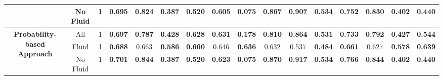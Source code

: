 \begin{table}[!ht]
{\begin{tabular}{|c|c|c|ccc|ccc|ccc|c|c|c|c|}
			& No Fluid & 1 & \multicolumn{1}{c|}{0.695} & \multicolumn{1}{c|}{0.824} & \textbf{0.387} & \multicolumn{1}{c|}{\textbf{0.520}} & \multicolumn{1}{c|}{0.605} & \textbf{0.075} & \multicolumn{1}{c|}{0.867} & \multicolumn{1}{c|}{0.907} & \textbf{0.534} & 0.752 & 0.830 & \textbf{0.402} & \textbf{0.440} \\
			
			\hline
			\hline
			
			\multirow{3}{*}{\parbox{2cm}{\textbf{Probability-based Approach}}} & All & 1 & \multicolumn{1}{c|}{\textbf{0.697}} & \multicolumn{1}{c|}{\textbf{0.787}} & \textbf{0.428} & \multicolumn{1}{c|}{\textbf{0.628}} & \multicolumn{1}{c|}{\textbf{0.631}} & \textbf{0.178} & \multicolumn{1}{c|}{\textbf{0.810}} & \multicolumn{1}{c|}{\textbf{0.864}} & \textbf{0.531} & \textbf{0.733} & \textbf{0.792} & \textbf{0.427} & \textbf{0.544} \\
			
			& Fluid & 1 & \multicolumn{1}{c|}{\textbf{0.688}} & \multicolumn{1}{c|}{0.663} & \textbf{0.586} & \multicolumn{1}{c|}{\textbf{0.660}} & \multicolumn{1}{c|}{0.646} & \textbf{0.636} & \multicolumn{1}{c|}{0.632} & \multicolumn{1}{c|}{0.537} & \textbf{0.484} & \textbf{0.661} & 0.627 & \textbf{0.578} & \textbf{0.639} \\
			
			& No Fluid & 1 & \multicolumn{1}{c|}{\textbf{0.701}} & \multicolumn{1}{c|}{\textbf{0.844}} & \textbf{0.387} & \multicolumn{1}{c|}{\textbf{0.520}} & \multicolumn{1}{c|}{\textbf{0.623}} & \textbf{0.075} & \multicolumn{1}{c|}{\textbf{0.870}} & \multicolumn{1}{c|}{\textbf{0.917}} & \textbf{0.534} & \textbf{0.766} & \textbf{0.844} & \textbf{0.402} & \textbf{0.440} \\
			
			\hline
			
	\end{tabular}}
	\label{tab:Experiment2FinalResults}
\end{table}

